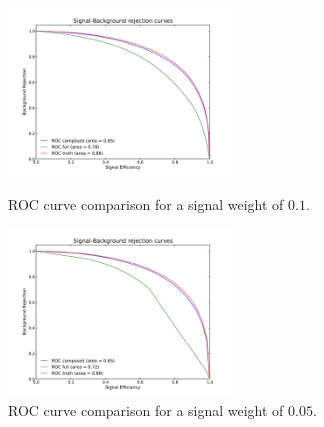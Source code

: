 \documentclass[a4paper]{jpconf}
\begin{document}
\begin{figure}[h]
\hspace{3pc}
\begin{minipage}{14pc}
\includegraphics[width=14pc]{comp_all_mlp_sigbkg_01.pdf}
\caption{\label{fig:roc1} ROC curve comparison for a signal weight of $0.1$.} %
\end{minipage}\hspace{2pc}%
\begin{minipage}{14pc}
\includegraphics[width=14pc]{comp_all_mlp_sigbkg_005.pdf}
\caption{\label{fig:roc2} ROC curve comparison for a signal weight of $0.05$.}
\end{minipage}
\end{figure}
\end{document}
